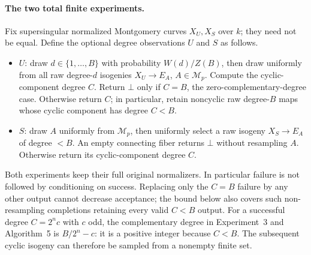 \documentclass[11pt]{article}
\begin{document}
\paragraph{The two total finite experiments.}
Fix supersingular normalized Montgomery curves $X_U,X_S$ over $k$; they need not
be equal. Define the optional degree observations $U$ and $S$ as follows.
\begin{itemize}
\item $U$: draw $d\in\{1,\ldots,B\}$ with probability $W(d)/Z(B)$, then draw uniformly
from all raw degree-$d$ isogenies $X_U\to E_A$, $A\in\mathcal M_p$.
Compute the cyclic-component degree $C$. Return $\bot$ only if $C=B$, the
zero-complementary-degree case. Otherwise return $C$; in particular, retain
noncyclic raw degree-$B$ maps whose cyclic component has degree $C<B$.
\item $S$: draw $A$ uniformly from $\mathcal M_p$, then uniformly select a raw
isogeny $X_S\to E_A$ of degree $<B$. An empty connecting fiber returns $\bot$
without resampling $A$. Otherwise return its cyclic-component degree $C$.
\end{itemize}
Both experiments keep their full original normalizers. In particular failure
is not followed by conditioning on success. Replacing only the $C=B$ failure
by any other output cannot decrease acceptance; the bound below also covers
such non-resampling completions retaining every valid $C<B$ output. For a successful degree
$C=2^n c$ with $c$ odd, the complementary degree in Experiment~3 and Algorithm~5
is $B/2^n-c$: it is a positive integer because $C<B$. The subsequent cyclic
isogeny can therefore be sampled from a nonempty finite set.
\end{document}
